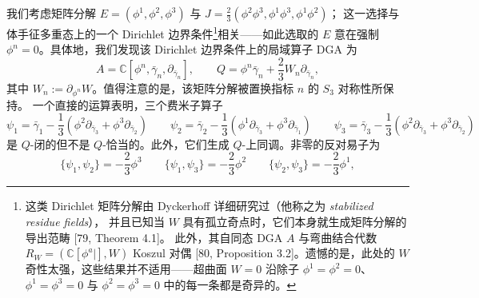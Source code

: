 我们考虑矩阵分解 $E=(\phi^1,\phi^2,\phi^3)$ 与 $J=\frac{2}{3}(\phi^2\phi^3,\phi^1\phi^3,\phi^1\phi^2)$；
这一选择与体手征多重态上的一个 Dirichlet 边界条件\footnote{%
这类 Dirichlet 矩阵分解由 Dyckerhoff 详细研究过（他称之为 \emph{stabilized residue fields}），
并且已知当 $W$ 具有孤立奇点时，它们本身就生成矩阵分解的导出范畴 [79, Theorem 4.1]。
此外，其自同态 DGA $A$ 与弯曲结合代数 $R_W = (\mathbb{C}[\phi^a|], W)$ Koszul 对偶
[80, Proposition 3.2]。遗憾的是，此处的 $W$ 奇性太强，这些结果并不适用——超曲面 $W = 0$
沿除子 $\phi^1 = \phi^2 = 0$、$\phi^1 = \phi^3 = 0$ 与 $\phi^2 = \phi^3 = 0$ 中的每一条都是奇异的。%
}相关——如此选取的 $E$ 意在强制 $\phi^n = 0$。具体地，我们发现该 Dirichlet 边界条件上的局域算子
DGA 为
\begin{equation}\tag{3.28}
A = \mathbb{C}[\phi^n, \bar\gamma_n, \partial_{\bar\gamma_n}], \qquad
Q = \phi^n\bar\gamma_n + \frac{2}{3}W_n\partial_{\bar\gamma_n},
\end{equation}
其中 $W_n := \partial_{\phi^n}W$。值得注意的是，该矩阵分解被置换指标 $n$ 的 $S_3$ 对称性所保持。
一个直接的运算表明，三个费米子算子
\begin{equation}\tag{3.29}
\psi_1 = \bar\gamma_1 - \frac{1}{3}\left(\phi^2\partial_{\bar\gamma_3} + \phi^3\partial_{\bar\gamma_2}\right) \qquad
\psi_2 = \bar\gamma_2 - \frac{1}{3}\left(\phi^1\partial_{\bar\gamma_3} + \phi^3\partial_{\bar\gamma_1}\right) \qquad
\psi_3 = \bar\gamma_3 - \frac{1}{3}\left(\phi^2\partial_{\bar\gamma_3} + \phi^3\partial_{\bar\gamma_2}\right)
\end{equation}
是 $Q$-闭的但不是 $Q$-恰当的。此外，它们生成 $Q$-上同调。非零的反对易子为
\begin{equation}\tag{3.30}
\{\psi_1,\psi_2\} = -\frac{2}{3}\phi^3 \qquad
\{\psi_1,\psi_3\} = -\frac{2}{3}\phi^2 \qquad
\{\psi_2,\psi_3\} = -\frac{2}{3}\phi^1 ,
\end{equation}

